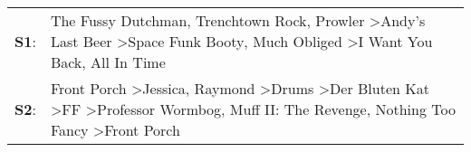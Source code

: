 \begin{supertabular}{p{0.03\textwidth}p{0.92\textwidth}}
 \textbf{S1}:  &                                                                                                 The Fussy Dutchman\textsuperscript{}, \enspace Trenchtown Rock\textsuperscript{}, \enspace Prowler\textsuperscript{} \textgreater \enspace Andy's Last Beer\textsuperscript{} \textgreater \enspace Space Funk Booty\textsuperscript{}, \enspace Much Obliged\textsuperscript{} \textgreater \enspace I Want You Back\textsuperscript{}, \enspace All In Time\textsuperscript{}  \enspace  \\
 \textbf{S2}:  &  Front Porch\textsuperscript{} \textgreater \enspace Jessica\textsuperscript{}, \enspace Raymond\textsuperscript{} \textgreater \enspace Drums\textsuperscript{} \textgreater \enspace Der Bluten Kat\textsuperscript{} \textgreater \enspace FF\textsuperscript{} \textgreater \enspace Professor Wormbog\textsuperscript{}, \enspace Muff II: The Revenge\textsuperscript{}, \enspace Nothing Too Fancy\textsuperscript{} \textgreater \enspace Front Porch\textsuperscript{}  \enspace  \\
\end{supertabular}
